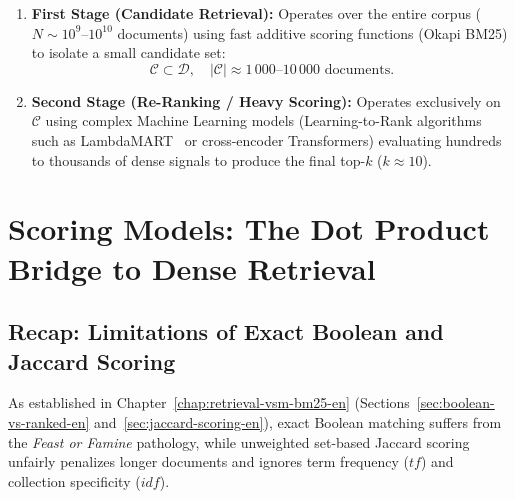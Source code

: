 \begin{enumerate}
    \item \textbf{First Stage (Candidate Retrieval):} Operates over the entire corpus ($N \sim 10^9\text{--}10^{10}$ documents) using fast additive scoring functions (Okapi BM25) to isolate a small candidate set:
    \begin{equation}
    \mathcal{C} \subset \mathcal{D}, \quad |\mathcal{C}| \approx 1\,000 \text{--} 10\,000 \text{ documents}.
    \end{equation}
    \item \textbf{Second Stage (Re-Ranking / Heavy Scoring):} Operates exclusively on $\mathcal{C}$ using complex Machine Learning models (Learning-to-Rank algorithms such as LambdaMART~\cite{burges2010} or cross-encoder Transformers) evaluating hundreds to thousands of dense signals to produce the final top-$k$ ($k \approx 10$).
\end{enumerate}

\FloatBarrier
\section{Scoring Models: The Dot Product Bridge to Dense Retrieval}
\label{sec:scoring-bridge-en}

\subsection{Recap: Limitations of Exact Boolean and Jaccard Scoring}
As established in Chapter~\ref{chap:retrieval-vsm-bm25-en} (Sections~\ref{sec:boolean-vs-ranked-en} and~\ref{sec:jaccard-scoring-en}), exact Boolean matching suffers from the \textit{Feast or Famine} pathology, while unweighted set-based Jaccard scoring unfairly penalizes longer documents and ignores term frequency ($tf$) and collection specificity ($idf$).

